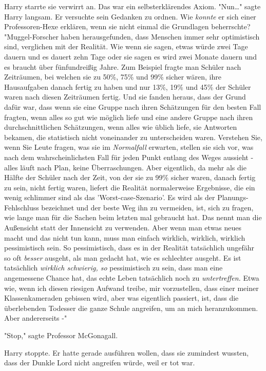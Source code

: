 {Harry starrte sie verwirrt an. Das war ein selbsterklärendes Axiom. "Nun…" sagte Harry langsam. Er versuchte sein Gedanken zu ordnen. Wie \emph{konnte} er sich einer Professoren-Hexe erklären, wenn sie nicht einmal die Grundlagen beherrschte? "Muggel-Forscher haben herausgefunden, dass Menschen immer sehr optimistisch sind, verglichen mit der Realität. Wie wenn sie sagen, etwas würde zwei Tage dauern und es dauert zehn Tage oder sie sagen es wird zwei Monate dauern und es braucht über fünfundreißig Jahre. Zum Beispiel fragte man Schüler nach Zeiträumen, bei welchen sie zu 50\%, 75\% und 99\% sicher wären, ihre Hausaufgaben danach fertig zu haben und nur 13\%, 19\% und 45\% der Schüler waren nach diesen Zeiträumen fertig. Und sie fanden heraus, dass der Grund dafür war, dass wenn sie eine Gruppe nach ihren Schätzungen für den besten Fall fragten, wenn alles so gut wie möglich liefe und eine andere Gruppe nach ihren durchschnittlichen Schätzungen, wenn alles wie üblich liefe, sie Antworten bekamen, die statistisch nicht voneinander zu unterscheiden waren. Verstehen Sie, wenn Sie Leute fragen, was sie im \emph{Normalfall} erwarten, stellen sie sich vor, was nach dem wahrscheinlichsten Fall für jeden Punkt entlang des Weges aussieht - alles läuft nach Plan, keine Überraschungen. Aber eigentlich, da mehr als die Hälfte der Schüler nach der Zeit, von der sie zu 99\% sicher waren, danach fertig zu sein, nicht fertig waren, liefert die Realität normalerweise Ergebnisse, die ein wenig schlimmer sind als das 'Worst-case-Szenario'. Es wird als der Planungs-Fehlschluss bezeichnet und der beste Weg ihn zu vermeiden, ist, sich zu fragen, wie lange man für die Sachen beim letzten mal gebraucht hat. Das nennt man die Außensicht statt der Innensicht zu verwenden. Aber wenn man etwas neues macht und das nicht tun kann, muss man einfach wirklich, wirklich, wirklich pessimistisch sein. So pessimistisch, dass es in der Realität tatsächlich ungefähr so oft \emph{besser} ausgeht, als man gedacht hat, wie es schlechter ausgeht. Es ist tatsächlich \emph{wirklich schwierig, so} pessimistisch zu sein, dass man eine angemessene Chance hat, das echte Leben tatsächlich noch zu \emph{untertreffen.} Etwa wie, wenn ich diesen riesigen Aufwand treibe, mir vorzustellen, dass einer meiner Klassenkameraden gebissen wird, aber was eigentlich passiert, ist, dass die überlebenden Todesser die ganze Schule angreifen, um an mich heranzukommen. Aber andererseits -"

"Stop," sagte Professor McGonagall.

Harry stoppte. Er hatte gerade ausführen wollen, dass sie zumindest wussten, dass der Dunkle Lord nicht angreifen würde, weil er tot war.

}
